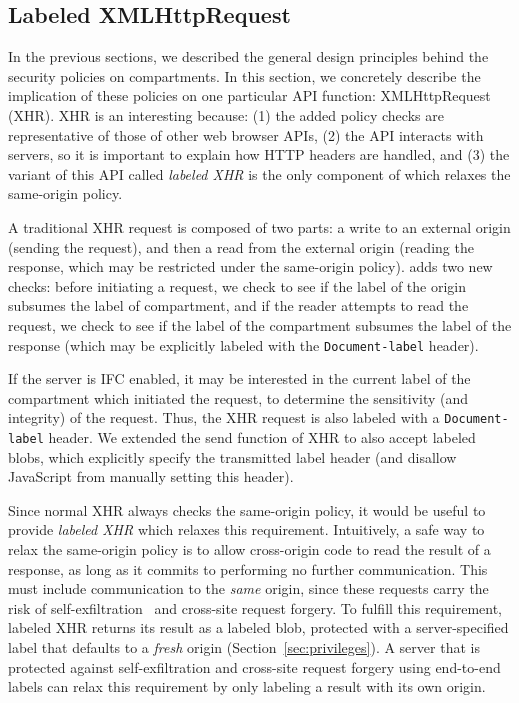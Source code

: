 \subsection{Labeled XMLHttpRequest}

In the previous sections, we described the general design principles
behind the security policies on compartments.
%
In this section, we concretely describe the implication of these
policies on one particular API function: XMLHttpRequest (XHR).
%
XHR is an interesting because: (1) the added \sys{} policy checks are
representative of those of other web browser APIs, (2) the API
interacts with servers, so it is important to explain how HTTP headers are
handled, and (3) the variant of this API called \emph{labeled XHR} is
the only component of \sys{} which relaxes the same-origin policy.

A traditional XHR request is composed of two parts: a write to an
external origin (sending the request), and then a read from the external
origin (reading the response, which may be restricted under the
same-origin policy).
%
\sys{} adds two new checks: before initiating a
request, we check to see if the label of the origin subsumes the label
of compartment, and if the reader attempts to read the request, we check
to see if the label of the compartment subsumes the label of the response
(which may be explicitly labeled with the {\tt Document-label} header).

If the server is IFC enabled, it may be interested in the current label
of the compartment which initiated the request, to determine the
sensitivity (and integrity) of the request.
%
Thus, the XHR request is also labeled with a {\tt Document-label} header.
%
We extended the send function of XHR to also accept labeled blobs,
which explicitly specify the transmitted label header (and disallow
JavaScript from manually setting this header).

Since normal XHR always checks the same-origin policy, it would be
useful to provide \emph{labeled XHR} which relaxes this requirement.
%
Intuitively, a safe way to relax the same-origin policy is to allow
cross-origin code to read the result of a response, as long as it
commits to performing no further communication.
%
This must include communication to the \emph{same} origin, since these requests
carry the risk of self-exfiltration~ and cross-site request
forgery.
%
To fulfill this requirement, labeled XHR returns its result as a labeled
blob, protected with a server-specified label that defaults to a \emph{fresh}
origin (Section~\ref{sec:privileges}).
%
A server that is protected against self-exfiltration and cross-site
request forgery using end-to-end labels can relax this requirement by
only labeling a result with its own origin.


